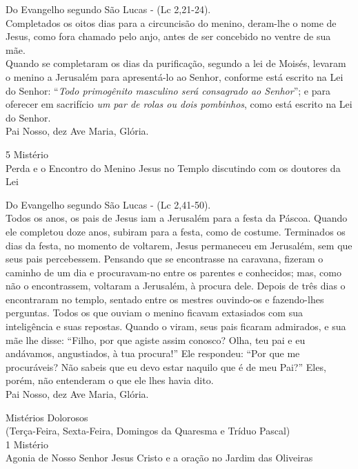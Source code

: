 \begin{flushleft}
    Do Evangelho segundo São Lucas - (\textcolor{VioletRed3}{Lc 2,21-24}). \\
    \hfill{} \break{}
    Completados os oitos dias para a circuncisão do menino, deram-lhe o nome de Jesus, como fora chamado pelo anjo, antes de ser concebido no ventre de sua mãe.
    \vspace{.2cm} \\
    Quando se completaram os dias da purificação, segundo a lei de Moisés, levaram o menino a Jerusalém para apresentá-lo ao Senhor, conforme está escrito na Lei do Senhor: ``\textit{Todo primogênito masculino será consagrado ao Senhor}''; e para oferecer em sacrifício \textit{um par de rolas ou dois pombinhos}, como está escrito na Lei do Senhor. \\
    \hfill{} \break{}
    Pai Nosso, dez Ave Maria, Glória.
\end{flushleft}
\begin{center}
    5\textordmasculine{} Mistério \\ Perda e o Encontro do Menino Jesus no Templo discutindo com os doutores da Lei
\end{center}
\begin{flushleft}
    Do Evangelho segundo São Lucas - (\textcolor{VioletRed3}{Lc 2,41-50}). \\
    \hfill{} \break{}
    Todos os anos, os pais de Jesus iam a Jerusalém para a festa da Páscoa. Quando ele completou doze anos, subiram para a festa, como de costume. Terminados os dias da festa, no momento de voltarem, Jesus permaneceu em Jerusalém, sem que seus pais percebessem. Pensando que se encontrasse na caravana, fizeram o caminho de um dia e procuravam-no entre os parentes e conhecidos; mas, como não o encontrassem, voltaram a Jerusalém, à procura dele. Depois de três dias o encontraram no templo, sentado entre os mestres ouvindo-os e fazendo-lhes perguntas. Todos os que ouviam o menino ficavam extasiados com sua inteligência e suas repostas. Quando o viram, seus pais ficaram admirados, e sua mãe lhe disse: ``Filho, por que agiste assim conosco? Olha, teu pai e eu andávamos, angustiados, à tua procura!'' Ele respondeu: ``Por que me procuráveis? Não sabeis que eu devo estar naquilo que é de meu Pai?'' Eles, porém, não entenderam o que ele lhes havia dito. \\
    \hfill{} \break{}
    Pai Nosso, dez Ave Maria, Glória.
\end{flushleft}
\newpage
\begin{center}
    Mistérios Dolorosos \\ \textcolor{VioletRed3}{\scriptsize{(Terça-Feira, Sexta-Feira, Domingos da Quaresma e Tríduo Pascal)}} \\
    \hfill{} \break{}
    1\textordmasculine{} Mistério \\ Agonia de Nosso Senhor Jesus Cristo e a oração no Jardim das Oliveiras
\end{center}

